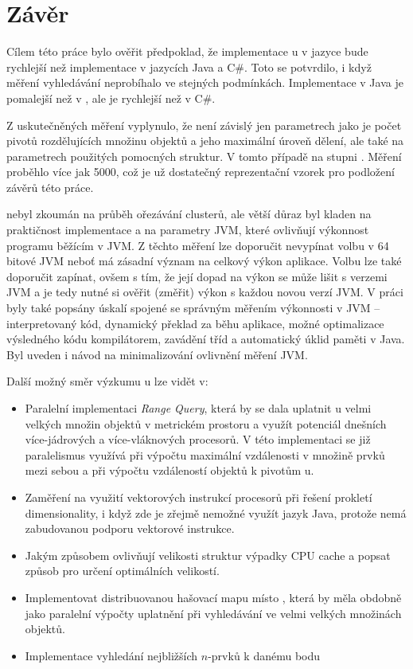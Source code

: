 \chapter{Závěr}

Cílem této práce bylo ověřit předpoklad, že implementace \MIndex u v jazyce \CC{} bude rychlejší než implementace v jazycích Java a C\#.
Toto se potvrdilo, i když měření vyhledávání neprobíhalo ve stejných podmínkách.
Implementace v Java je pomalejší než v \CC, ale je rychlejší než v C\#.

Z uskutečněných měření vyplynulo, že \MIndex{} není závislý jen parametrech jako je počet pivotů rozdělujících množinu objektů a jeho maximální úroveň dělení, ale také na parametrech použitých pomocných struktur.
V tomto případě na stupni \BPTree.
Měření proběhlo více jak 5000, což je už dostatečný reprezentační vzorek pro podložení závěrů této práce.

\MIndex{} nebyl zkoumán na průběh ořezávání clusterů, ale větší důraz byl kladen na praktičnost implementace a na parametry JVM, které ovlivňují výkonnost programu běžícím v JVM.
Z těchto měření lze doporučit nevypínat volbu  v 64 bitové JVM neboť má zásadní význam na celkový výkon aplikace.
Volbu  lze také doporučit zapínat, ovšem s tím, že její dopad na výkon se může lišit s verzemi JVM a je tedy nutné si ověřit (změřit) výkon s každou novou verzí JVM.
V práci byly také popsány úskalí spojené se správným měřením výkonnosti v JVM -- interpretovaný kód, dynamický překlad \bytecode{} za běhu aplikace, možné optimalizace výsledného kódu kompilátorem, zavádění tříd a automatický úklid paměti v Java.
Byl uveden i návod na minimalizování ovlivnění měření  JVM.

Další možný směr výzkumu \MIndex u lze vidět v:
\begin{itemize}
\item Paralelní implementaci \emph{Range Query}, která by se dala uplatnit u velmi velkých množin objektů v metrickém prostoru a využít potenciál dnešních více-jádrových a více-vláknových procesorů. V této implementaci se již paralelismus využívá při výpočtu maximální vzdálenosti v množině prvků mezi sebou a při výpočtu vzdáleností objektů k pivotům \MIndex u.
\item Zaměření na využití vektorových instrukcí procesorů při řešení prokletí dimensionality, i když zde je zřejmě nemožné využít jazyk Java, protože nemá zabudovanou podporu vektorové instrukce.
\item Jakým způsobem ovlivňují velikosti struktur výpadky CPU cache a popsat způsob pro určení optimálních velikostí.
\item Implementovat distribuovanou hašovací mapu místo \BPTree{}, která by měla obdobně jako paralelní výpočty uplatnění při vyhledávání ve velmi velkých množinách objektů.
\item Implementace vyhledání nejbližších $n$-prvků k danému bodu
 \end{itemize}
 
